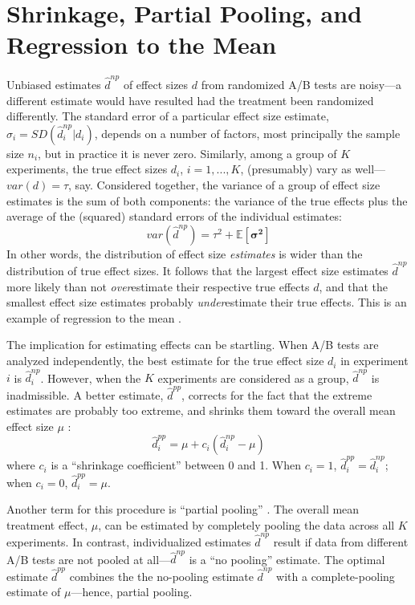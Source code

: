 \documentclass{edm_template}
\newcommand{\tauhat}{\hat{d}^{np}}
\newcommand{\shrink}{\hat{d}^{pp}}
\newcommand{\EE}{\mathbb{E}}
\begin{document}
\section{Shrinkage, Partial Pooling, and Regression to the Mean}\label{sec:shrinkage}
Unbiased estimates $\tauhat$ of effect sizes $d$ from randomized A/B tests are noisy---a different estimate would have resulted had the treatment been randomized differently.
The standard error of a particular effect size estimate, $\sigma_i=SD(\tauhat_i|d_i)$, depends on a number of factors, most principally the sample size $n_i$, but in practice it is never zero.
Similarly, among a group of $K$ experiments, the true effect sizes $d_i$, $i=1,...,K$, (presumably) vary as well---$var(d)=\tau$, say. 
Considered together, the variance of a group of effect size estimates is the sum of both components: the variance of the true effects plus the average of the (squared) standard errors of the individual estimates:
\begin{equation*}
var(\tauhat)=\tau^2+\EE[\bm{\sigma^2}]
\end{equation*}
In other words, the distribution of effect size \emph{estimates} is wider than the distribution of true effect sizes.
It follows that the largest effect size estimates $\tauhat$ more likely than not \emph{over}estimate their respective true effects $d$, and that the smallest effect size estimates probably \emph{under}estimate their true effects.
This is an example of regression to the mean \cite{galton}.

The implication for estimating effects can be startling.
When A/B tests are analyzed independently, the best estimate for the true effect size $d_i$ in experiment $i$ is $\tauhat_i$.
However, when the $K$ experiments are considered as a group, $\tauhat$ is inadmissible.
A better estimate, $\shrink$, corrects for the fact that the extreme estimates are probably too extreme, and shrinks them toward the overall mean effect size $\mu$ \cite{efron1977stein}:
\begin{equation}\label{eq:shrinkage}
\shrink_i=\mu+c_i\left(\tauhat_i-\mu\right)
\end{equation}
where $c_i$ is a ``shrinkage coefficient'' between 0 and 1. 
When $c_i=1$, $\shrink_i=\tauhat_i$; when $c_i=0$, $\shrink_i=\mu$.

Another term for this procedure is ``partial pooling'' \cite{gelmanHill}.
The overall mean treatment effect, $\mu$, can be estimated by completely pooling the data across all $K$ experiments.
In contrast, individualized estimates $\tauhat$ result if data from different A/B tests are not pooled at all---$\tauhat$ is a ``no pooling'' estimate.
The optimal estimate $\shrink$ combines the the no-pooling estimate $\tauhat$ with a complete-pooling estimate of $\mu$---hence, partial pooling. 
\end{document}
